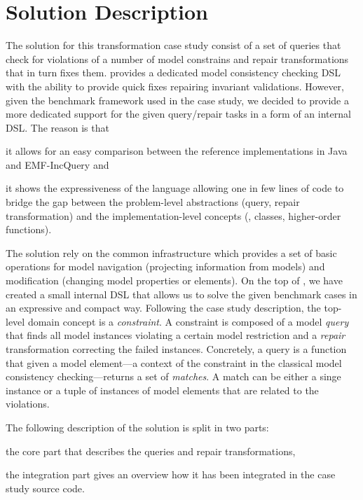 

\section{Solution Description}
\label{sec:SolutionDescription}

The solution for this transformation case study consist of a set of queries that check for violations of a number of model constrains and repair transformations that in turn fixes them.
\SIGMA provides a dedicated model consistency checking DSL with the ability to provide quick fixes repairing invariant validations.
However, given the benchmark framework used in the case study, we decided to provide a more dedicated support for the given query/repair tasks in a form of an internal DSL.
The reason is that
\begin{inparaenum}[(1)]
  \item it allows for an easy comparison between the reference implementations in Java and EMF-IncQuery and
  \item it shows the expressiveness of the language allowing one in few lines of code to bridge the gap between the problem-level abstractions (query, repair transformation) and the implementation-level concepts (\Eg, classes, higher-order functions).
\end{inparaenum}

The solution rely on the \SIGMA common infrastructure which provides a set of basic operations for model navigation (\Ie projecting information from models) and modification (\Ie changing model properties or elements).
On the top of \SIGMA, we have created a small internal DSL that allows us to solve the given benchmark cases in an expressive and compact way.
Following the case study description, the top-level domain concept is a \emph{constraint}.
A constraint is composed of a model \emph{query} that finds all model instances violating a certain model restriction and a \emph{repair} transformation correcting the failed instances.
Concretely, a query is a function that given a model element---\Ie a context of the constraint in the classical model consistency checking---returns a set of \emph{matches}.
A match can be either a singe instance or a tuple of instances of model elements that are related to the violations.

The following description of the solution is split in two parts:
\begin{inparaenum}[(1)]
  \item the core part that describes the queries and repair transformations,
  \item the integration part gives an overview how it has been integrated in the case study source code.
\end{inparaenum}

